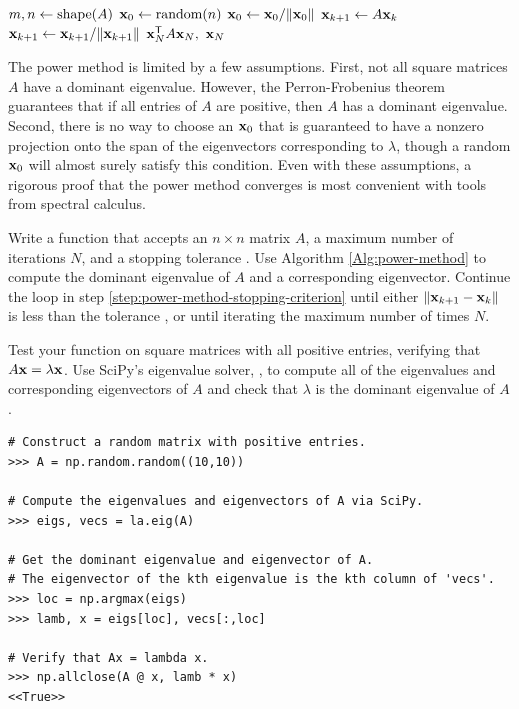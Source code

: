 \begin{algorithm}[H] %
\begin{algorithmic}[1]
    \State $m, n \gets \mathrm{shape}(A)$
    \State $\mathbf{x}_0 \gets \text{random}(n)$
    \State $\mathbf{x}_0 \gets \mathbf{x}_0/\|\mathbf{x}_0\|$
        \label{step:power-method-stopping-criterion}
        \State $\mathbf{x}_{k+1} \gets A\mathbf{x}_k$
        \State $\mathbf{x}_{k+1} \gets \mathbf{x}_{k+1}/\|\mathbf{x}_{k+1}\|$
    \EndFor
    \State {} $\mathbf{x}_N^{\mathsf T} A \mathbf{x}_N,\ \mathbf{x}_N$
\EndProcedure
\end{algorithmic}
\caption{}
\label{Alg:power-method}
\end{algorithm}

The power method is limited by a few assumptions.
First, not all square matrices $A$ have a dominant eigenvalue.
However, the Perron-Frobenius theorem guarantees that if all entries of $A$ are positive, then $A$ has a dominant eigenvalue.
Second, there is no way to choose an $\mathbf{x}_0$ that is guaranteed to have a nonzero projection onto the span of the eigenvectors corresponding to $\lambda$, though a random $\mathbf{x}_0$ will almost surely satisfy this condition.
Even with these assumptions, a rigorous proof that the power method converges is most convenient with tools from spectral calculus.

\begin{problem} %
Write a function that accepts an $n \times n$ matrix $A$, a maximum number of iterations $N$, and a stopping tolerance .
Use Algorithm \ref{Alg:power-method} to compute the dominant eigenvalue of $A$ and a corresponding eigenvector.
Continue the loop in step \ref{step:power-method-stopping-criterion} until either $\|\mathbf{x}_{k+1} - \mathbf{x}_k\|$ is less than the tolerance , or until iterating the maximum number of times $N$.

Test your function on square matrices with all positive entries, verifying that $A\mathbf{x} = \lambda\mathbf{x}$.
Use SciPy's eigenvalue solver, , to compute all of the eigenvalues and corresponding eigenvectors of $A$ and check that $\lambda$ is the dominant eigenvalue of $A$.

\begin{lstlisting}
# Construct a random matrix with positive entries.
>>> A = np.random.random((10,10))

# Compute the eigenvalues and eigenvectors of A via SciPy.
>>> eigs, vecs = la.eig(A)

# Get the dominant eigenvalue and eigenvector of A.
# The eigenvector of the kth eigenvalue is the kth column of 'vecs'.
>>> loc = np.argmax(eigs)
>>> lamb, x = eigs[loc], vecs[:,loc]

# Verify that Ax = lambda x.
>>> np.allclose(A @ x, lamb * x)
<<True>>
\end{lstlisting}
\end{problem}

